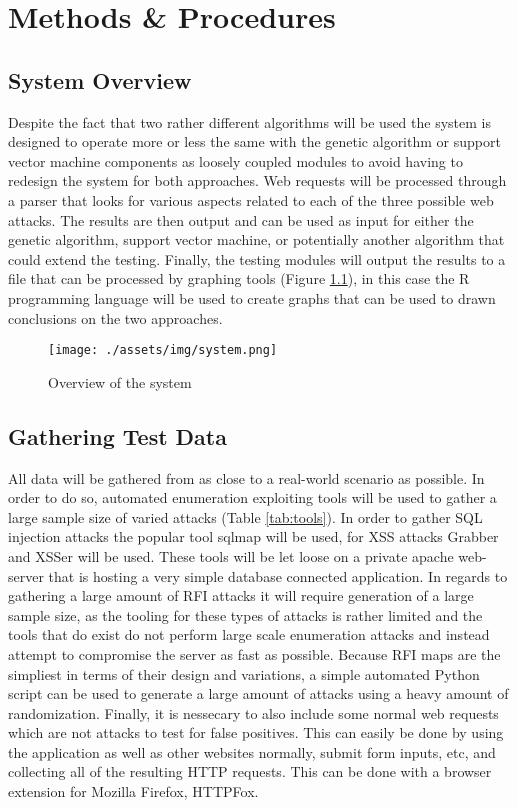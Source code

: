 \chapter{Methods \& Procedures}

\section{System Overview}

Despite the fact that two rather different algorithms will be used the system is designed to operate more or less the same with the genetic algorithm or support vector machine components as loosely coupled modules to avoid having to redesign the system for both approaches.  Web requests will be processed through a parser that looks for various aspects related to each of the three possible web attacks.  The results are then output and can be used as input for either the genetic algorithm, support vector machine, or potentially another algorithm that could extend the testing.  Finally, the testing modules will output the results to a file that can be processed by graphing tools (Figure \ref{fig:sys}), in this case the R programming language will be used to create graphs that can be used to drawn conclusions on the two approaches. %

\begin{figure}
	\label{fig:sys}
	\texttt{[image: ./assets/img/system.png]}
	\caption{Overview of the system}
\end{figure}

\section{Gathering Test Data}

All data will be gathered from as close to a real-world scenario as possible.  In order to do so, automated enumeration exploiting tools will be used to gather a large sample size of varied attacks (Table \ref{tab:tools}).  
In order to gather SQL injection attacks the popular tool sqlmap will be used, for XSS attacks Grabber and XSSer will be used. %
These tools will be let loose on a private apache web-server that is hosting a very simple database connected application. %
In regards to gathering a large amount of RFI attacks it will require generation of a large sample size, as the tooling for these types of attacks is rather limited and the tools that do exist do not perform large scale enumeration attacks and instead attempt to compromise the server as fast as possible. %
Because RFI maps are the simpliest in terms of their design and variations, a simple automated Python script can be used to generate a large amount of attacks using a heavy amount of randomization.  Finally, it is nessecary to also include some normal web requests which are not attacks to test for false positives.  This can easily be done by using the application as well as other websites normally, submit form inputs, etc, and collecting all of the resulting HTTP requests.  This can be done with a browser extension for Mozilla Firefox, HTTPFox. %

